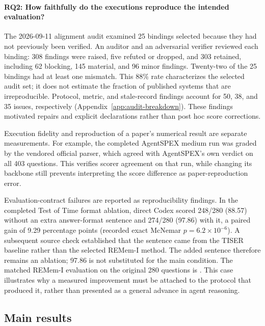 \paragraph{RQ2: How faithfully do the executions reproduce the intended evaluation?}
\label{sec:audit}
The 2026-09-11 alignment audit examined 25 bindings selected because they had not previously
been verified. An auditor and an adversarial verifier reviewed each binding: 308 findings were
raised, five refuted or dropped, and 303 retained, including 62 blocking, 145 material, and
96 minor findings. Twenty-two of the 25 bindings had at least one mismatch. This 88\% rate
characterizes the selected audit set; it does not estimate the fraction of published systems
that are irreproducible. Protocol, metric, and stale-record findings account for 50, 38, and
35 issues, respectively (Appendix~\ref{app:audit-breakdown}). These findings motivated repairs
and explicit declarations rather than post hoc score corrections.

Execution fidelity and reproduction of a paper's numerical result are separate measurements.
For example, the completed AgentSPEX medium run was graded by the vendored official parser,
which agreed with AgentSPEX's own verdict on all 403 questions. This verifies scorer agreement
on that run, while changing its backbone still prevents interpreting the score difference as
paper-reproduction error. 

Evaluation-contract failures are reported as reproducibility findings. In the completed
Test of Time format ablation, direct Codex scored 248/280 (88.57) without an extra answer-format
sentence and 274/280 (97.86) with it, a paired gain of 9.29 percentage points (recorded exact
McNemar $p=6.2\times10^{-6}$). A subsequent source check established that the sentence came
from the TISER baseline rather than the selected REMem-I method. The added sentence therefore
remains an ablation; 97.86 is not substituted for the main condition. The matched REMem-I evaluation on the original 280 questions is . This case illustrates why a measured improvement must be attached
to the protocol that produced it, rather than presented as a general advance in agent reasoning.

\subsection{Main results}
\label{sec:main-results}

